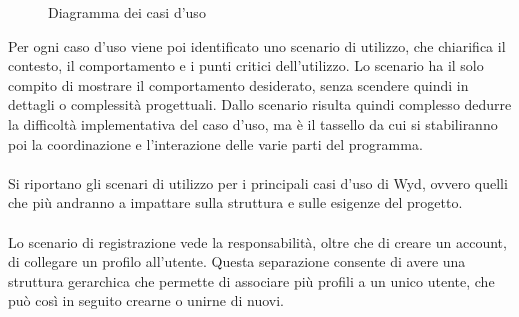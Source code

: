 \begin{figure}[htb]
    \centering
    \caption{Diagramma dei casi d'uso}
\end{figure}

Per ogni caso d'uso viene poi identificato uno scenario di utilizzo, 
che chiarifica il contesto, il comportamento e i punti critici dell'utilizzo.
Lo scenario ha il solo compito di mostrare il comportamento desiderato,
senza scendere quindi in dettagli o complessità progettuali. 
Dallo scenario risulta quindi complesso dedurre la difficoltà implementativa del caso d'uso,
ma è il tassello da cui si stabiliranno poi la coordinazione e l'interazione delle varie parti del programma.\\
\\
Si riportano gli scenari di utilizzo per i principali casi d'uso di Wyd, 
ovvero quelli che più andranno a impattare sulla struttura e sulle esigenze del progetto.\\
\\
Lo scenario di registrazione vede la responsabilità, oltre che di creare un account, 
di collegare un profilo all'utente.
Questa separazione consente di avere una struttura gerarchica 
che permette di associare più profili a un unico utente, 
che può così in seguito crearne o unirne di nuovi.\\

